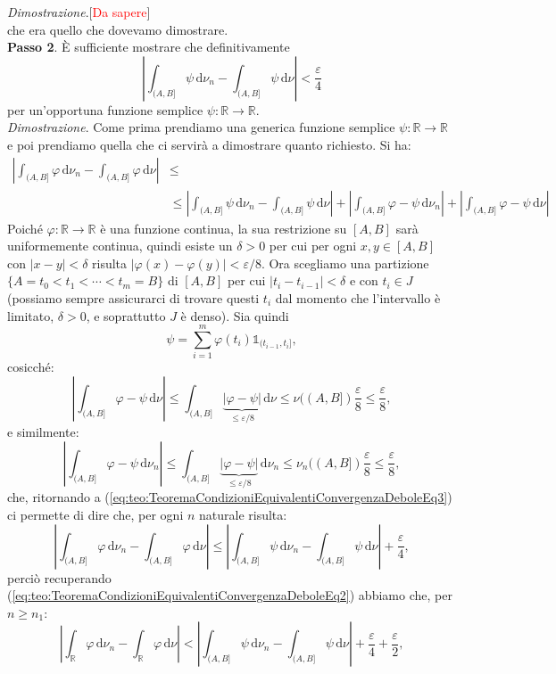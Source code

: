 \documentclass[11pt]{book}
\makeatletter
\theoremstyle{Definizione}
\theoremstyle{TeoremaProposizioneLemmaCorollario}
\theoremstyle{OsservazioneNota}
\renewenvironment{proof}[1][\proofname]{\par
  \normalfont \topsep6\p@\@plus6\p@\relax
  \trivlist
  \item[\hskip\labelsep
        \itshape
    #1\@addpunct{.}]\ignorespaces
}{%
  \endtrivlist\@endpefalse
}
\newcommand{\R}{\mathbb{R}}
\renewcommand{\d}{\mathrm{d}}
\newcommand{\uno}[1]{\mathds{1}_{#1}}
\renewenvironment{proof}{\textsl{Dimostrazione}.}{}
\makeatother
\begin{document}
\begin{boxteo}{}
\begin{proof}[\textcolor{red}{Da sapere}]
\begin{equation}
\end{equation}
che era quello che dovevamo dimostrare.\\
\textbf{Passo 2}. È sufficiente mostrare che definitivamente
$$
\left|\int_{(A,B]}\psi \,\d\nu_n-\int_{(A,B]}\psi \,\d\nu\right| < \frac{\varepsilon}{4}
$$
per un'opportuna funzione semplice $\psi:\R\longrightarrow \R$.\\
\textsl{Dimostrazione}. Come prima prendiamo una generica funzione semplice $\psi:\R\longrightarrow \R$ e poi prendiamo quella che ci servirà a dimostrare quanto richiesto. Si ha:
\begin{align}\label{eq:teo:TeoremaCondizioniEquivalentiConvergenzaDeboleEq3}
\left|\int_{(A,B]}\varphi \,\d\nu_n -\int_{(A,B]}\varphi \,\d\nu\right| &\leq \\ 
&\leq \left|\int_{(A,B]} \psi \,\d\nu_n-\int_{(A,B]}\psi \,\d\nu\right|+\left|\int_{(A,B]} \varphi-\psi\,\d\nu_n\right|+\left|\int_{(A,B]}\varphi-\psi\,\d\nu\right| \nonumber
\end{align}
Poiché $\varphi:\R \longrightarrow \R$ è una funzione continua, la sua restrizione su $[A,B]$ sarà uniformemente continua, quindi esiste un $\delta > 0$ per cui per ogni $x,y\in [A,B]$ con $|x-y|<\delta$ risulta $|\varphi(x)-\varphi(y)|< \varepsilon/8$. Ora scegliamo una partizione $\{A =t_0<t_1<\cdots<t_m = B\}$ di $[A,B]$ per cui $|t_i-t_{i-1}|< \delta$ e con $t_i\in J$ (possiamo sempre assicurarci di trovare questi $t_i$ dal momento che l'intervallo è limitato, $\delta > 0$, e soprattutto $J$ è denso). Sia quindi
$$
\psi = \sum_{i = 1}^m \varphi(t_i) \uno{(t_{i-1},t_i]},
$$
cosicché:
$$
\left|\int_{(A,B]}\varphi-\psi\,\d\nu\right|\leq \int_{(A,B]}\underbrace{|\varphi-\psi|}_{\leq \varepsilon/8}\,\d\nu \leq \nu((A,B]) \frac{\varepsilon}{8}\leq \frac{\varepsilon}{8},
$$
e similmente:
$$
\left|\int_{(A,B]}\varphi-\psi\,\d\nu_n\right|\leq \int_{(A,B]}\underbrace{|\varphi-\psi|}_{\leq \varepsilon/8}\,\d\nu_n \leq \nu_n((A,B]) \frac{\varepsilon}{8}\leq \frac{\varepsilon}{8},
$$
che, ritornando a (\ref{eq:teo:TeoremaCondizioniEquivalentiConvergenzaDeboleEq3}) ci permette di dire che, per ogni $n$ naturale risulta:
$$
\left|\int_{(A,B]}\varphi \,\d\nu_n-\int_{(A,B]} \varphi\,\d\nu\right| \leq \left|\int_{(A,B]}\psi \,\d\nu_n-\int_{(A,B]}\psi \,\d\nu\right| + \frac{\varepsilon}{4},
$$
perciò recuperando (\ref{eq:teo:TeoremaCondizioniEquivalentiConvergenzaDeboleEq2}) abbiamo che, per $n\geq n_1$:
$$
\left|\int_\R \varphi \,\d\nu_n-\int_\R \varphi \,\d\nu\right| < \left|\int_{(A,B]}\psi \,\d\nu_n-\int_{(A,B]}\psi \,\d\nu\right| + \frac{\varepsilon}{4}+\frac{\varepsilon}{2},
$$
\end{proof}
\end{boxteo}
\end{document}
